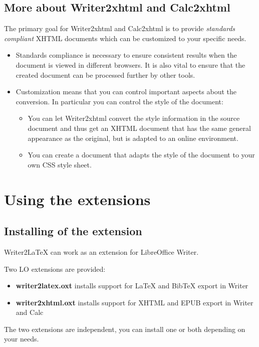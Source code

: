 \documentclass{article}
\newcommand\liststyleLiv{%
\renewcommand\labelitemi{${\bullet}$}
\renewcommand\labelitemii{${\circ}$}
\renewcommand\labelitemiii{${\blacksquare}$}
\renewcommand\labelitemiv{${\bullet}$}
}
\newcommand\liststyleLv{%
\renewcommand\labelitemi{${\bullet}$}
\renewcommand\labelitemii{${\circ}$}
\renewcommand\labelitemiii{${\blacksquare}$}
\renewcommand\labelitemiv{${\bullet}$}
}
\begin{document}
\subsection{More about Writer2xhtml and Calc2xhtml}
{\mdseries
The primary goal for Writer2xhtml and Calc2xhtml is to provide \emph{standards compliant} XHTML documents which can be customized to your specific needs.}

\liststyleLiv
\begin{itemize}
\item Standards compliance is necessary to ensure consistent results when the document is viewed in different browsers. It is also vital to ensure that the created document can be processed further by other tools.
\item Customization means that you can control important aspects about the conversion. In particular you can control the style of the document:

\begin{itemize}
\item You can let Writer2xhtml convert the style information in the source document and thus get an XHTML document that has the same general appearance as the original, but is adapted to an online environment.
\item You can create a document that adapts the style of the document to your own CSS style sheet.
\end{itemize}
\end{itemize}
\section{Using the extensions}
\subsection{Installing of the extension}
{\mdseries
Writer2LaTeX can work as an extension for LibreOffice Writer.}

{\mdseries
Two LO extensions are provided:}

\liststyleLv
\begin{itemize}
\item \textbf{writer2latex.oxt} installs support for LaTeX and BibTeX export in Writer
\item \textbf{writer2xhtml.oxt} installs support for XHTML and EPUB export in Writer and Calc
\end{itemize}
{\mdseries
The two extensions are independent, you can install one or both depending on your needs.}
\end{document}
